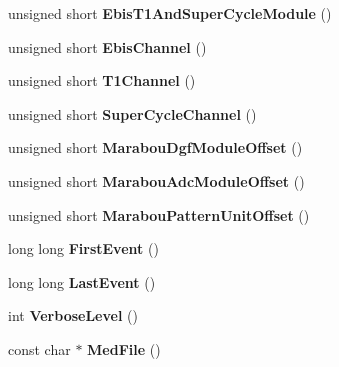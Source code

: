 \begin{DoxyCompactItemize}
unsigned short {\bfseries Ebis\+T1\+And\+Super\+Cycle\+Module} ()
\item 
\mbox{\label{class_global_settings_af9cbfd6c5cd67d7efb49f7c23ef4320b}} 
unsigned short {\bfseries Ebis\+Channel} ()
\item 
\mbox{\label{class_global_settings_a02d32bf705627b6d8e878ee1e6c69912}} 
unsigned short {\bfseries T1\+Channel} ()
\item 
\mbox{\label{class_global_settings_a6395f10d579a2fb086f72979322a9ca3}} 
unsigned short {\bfseries Super\+Cycle\+Channel} ()
\item 
\mbox{\label{class_global_settings_a8f3ef06ff28b68746bb18833c343bc15}} 
unsigned short {\bfseries Marabou\+Dgf\+Module\+Offset} ()
\item 
\mbox{\label{class_global_settings_a2bffff3342768138d92eb4bba965de8f}} 
unsigned short {\bfseries Marabou\+Adc\+Module\+Offset} ()
\item 
\mbox{\label{class_global_settings_a3a66dee38bb8974fe42269881f58e6f4}} 
unsigned short {\bfseries Marabou\+Pattern\+Unit\+Offset} ()
\item 
\mbox{\label{class_global_settings_adaf6b3cb383cea55ee595422baf2d6a4}} 
long long {\bfseries First\+Event} ()
\item 
\mbox{\label{class_global_settings_ac34c73a865be96c6c21edcf6f99fc35e}} 
long long {\bfseries Last\+Event} ()
\item 
\mbox{\label{class_global_settings_a922a7140b177a6fc02509fe2e443732e}} 
int {\bfseries Verbose\+Level} ()
\item 
\mbox{\label{class_global_settings_a76ba56132fe67495a9c5c3a041a48a08}} 
const char $\ast$ {\bfseries Med\+File} ()
\item 
\mbox{\label{class_global_settings_adbe98db49b93666afb5d9cb76e671f79}} 

\end{DoxyCompactItemize}

